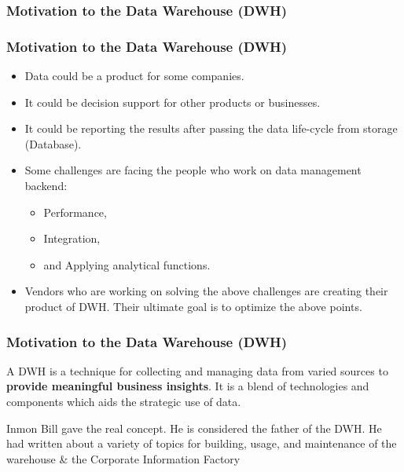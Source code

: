 \subsubsection{Motivation to the Data Warehouse (DWH)}
\begin{frame}
\frametitle{Motivation to the Data Warehouse (DWH)}
	\begin{itemize}[<+->]
		\item Data could be a product for some companies.
		\item It could be decision support for other products or businesses.
		\item It could be reporting the results after passing the data life-cycle from storage (Database).
		\item Some challenges are facing the people who work on data management backend:
			\begin{itemize}[<+->]
				\item Performance,
				\item Integration,
				\item and Applying analytical functions. %
			\end{itemize}
		\item Vendors who are working on solving the above challenges are creating their product of DWH. Their ultimate goal is to optimize the above points.
	\end{itemize}
\end{frame}
\begin{frame}[c]
\frametitle{Motivation to the Data Warehouse (DWH)}

\begin{definition} A DWH is a technique for collecting and managing data from varied sources to \textbf{provide meaningful business insights}. It is a blend of technologies and components which aids the strategic use of data.%
\end{definition}

Inmon Bill gave the real concept. He is considered the father of the DWH. He had written about a variety of topics for building, usage, and maintenance of the warehouse \& the Corporate Information Factory


\end{frame}

